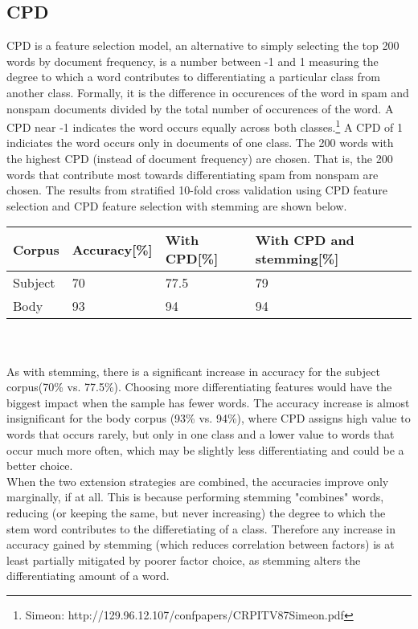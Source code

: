 \documentclass[12pt]{article}
\begin{document}
\subsection{CPD}
CPD is a feature selection model, an alternative to simply selecting the top 200 words by document frequency, is a number between -1 and 1 measuring the degree to which a word contributes to differentiating a particular class from another class. Formally, it is the difference in occurences of the word in spam and nonspam documents divided by the total number of occurences of the word. A CPD near -1 indicates the word occurs equally across both classes.\footnote{Simeon: http://129.96.12.107/confpapers/CRPITV87Simeon.pdf} A CPD of 1 indiciates the word occurs only in documents of one class. The 200 words with the highest CPD (instead of document frequency) are chosen. That is, the 200 words that contribute most towards differentiating spam from nonspam are chosen. The results from stratified 10-fold cross validation using CPD feature selection and CPD feature selection with stemming are shown below.\\

\begin{tabular}{ | l | l | l | l |}
\hline
Corpus & Accuracy[\%] & With CPD[\%] & With CPD and stemming[\%]\\ \hline
Subject & 70 & 77.5 & 79 \\ \hline
Body & 93 & 94 & 94 \\ \hline
\end{tabular} \\\\

As with stemming, there is a significant increase in accuracy for the subject corpus(70\% vs. 77.5\%). Choosing more differentiating features would have the biggest impact when the sample has fewer words. The accuracy increase is almost insignificant for the body corpus (93\% vs. 94\%), where CPD assigns high value to words that occurs rarely, but only in one class and a lower value to words that occur much more often, which may be slightly less differentiating and could be a better choice.\\
When the two extension strategies are combined, the accuracies improve only marginally, if at all. This is because performing stemming "combines" words, reducing (or keeping the same, but never increasing) the degree to which the stem word contributes to the differetiating of a class. Therefore any increase in accuracy gained by stemming (which reduces correlation between factors) is at least partially mitigated by poorer factor choice, as stemming alters the differentiating amount of a word.
\end{document}
